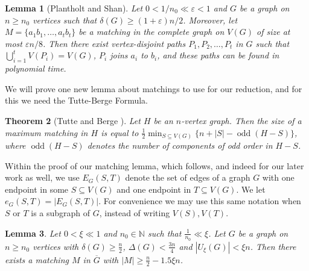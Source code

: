 \documentclass[11pt, oneside]{article}
\DeclareMathOperator{\odd}{odd}
\newcommand{\ve}{\varepsilon}
\newtheorem{theorem}{Theorem}
\newtheorem{lemma}[theorem]{Lemma}
\begin{document}
\begin{lemma}[Plantholt and Shan\cite{PS2023}]\label{lem:matching} Let $0<1/n_0\ll \varepsilon <1$ and $G$ be a graph on $n\geq n_0$ vertices such that $\delta(G)\geq (1+\ve)n/2$. Moreover, let $M=\{a_1b_1,\ldots,a_tb_t\}$ be a matching in the complete graph on $V(G)$ of size at most $\ve n/8$. Then there exist vertex-disjoint paths $P_1,P_2,\ldots,P_t$ in $G$ such that $\bigcup_{i=1}^{t} V(P_i)=V(G)$, $P_i$ joins $a_i$ to $b_i$, and these paths can be found in polynomial time.
\end{lemma}


We will prove one new lemma about matchings to use for our reduction, and for this we need the Tutte-Berge Formula.

\begin{theorem}[Tutte \cite{TutteTBformula} and Berge \cite{BergeTBformula}] Let $H$ be an $n$-vertex graph. Then the size of a maximum matching in $H$ is equal to $\tfrac{1}{2}\mathop{\min}_{S\subseteq V(G)}\{n+|S|-\odd(H-S) \}$, where $\odd(H-S)$ denotes the number of  components  of odd order in $H-S$. 
\end{theorem}

Within the proof of our matching lemma, which follows, and indeed for our later work as well, we use $E_G(S,T)$ denote the set of edges of a graph $G$ with one endpoint in some $S\subseteq V(G)$ and one endpoint in $T\subseteq V(G)$. We let $e_G(S,T) = |E_G(S,T)|$. For convenience we may use this same notation when $S$ or $T$ is a subgraph of $G$, instead of writing $V(S), V(T)$.  


\begin{lemma}\label{lem: large-matching}
Let $ 0<\xi  \ll 1$ and $n_0\in \mathbb{N}$ such that $\frac{1}{n_0} \ll \xi$.   Let $G$ be a graph on  $n \ge n_0$ vertices  with $\delta(G)\geq\frac{n}{2}$, $\Delta(G) < \frac{3n}{4}$ and  $|U_\xi(G)| < \xi n$.  Then there exists a matching $M$ in $\overline{G}$ with $|M|\geq \frac{n}{2}-1.5\xi n$.
\end{lemma}
\end{document}
